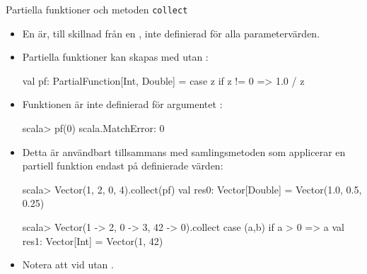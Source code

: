 \begin{Slide}{Partiella funktioner och metoden \texttt{collect}}\SlideFontSmall
\begin{itemize}
\item En   är, till skillnad från en  , inte definierad för alla parametervärden.
\item Partiella funktioner kan skapas med  utan :
\begin{Code}
val pf: PartialFunction[Int, Double] = { case z if z != 0 => 1.0 / z }  
\end{Code}
\item  Funktionen är inte definierad för argumentet :

\begin{REPLsmall}
scala> pf(0)                         
scala.MatchError: 0 
\end{REPLsmall}
\item 
Detta är användbart tillsammans med samlingsmetoden  som  applicerar en partiell funktion endast på definierade värden: 
\begin{REPLsmall}
scala> Vector(1, 2, 0, 4).collect(pf)
val res0: Vector[Double] = Vector(1.0, 0.5, 0.25)

scala> Vector(1 -> 2, 0 -> 3, 42 -> 0).collect{ case (a,b) if a > 0 => a } 
val res1: Vector[Int] = Vector(1, 42)

\end{REPLsmall}
\item Notera att  vid  utan .



\end{itemize}
\end{Slide}


